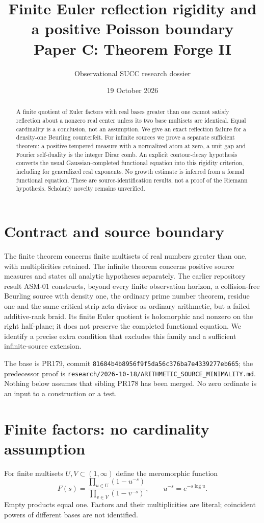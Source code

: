 \documentclass[11pt]{article}
\title{Finite Euler reflection rigidity and a positive Poisson boundary\\
\large Paper C: Theorem Forge II}
\author{Observational SUCC research dossier}
\date{19 October 2026}
\theoremstyle{remark}\newtheorem{remark}[theorem]{Remark}
\begin{document}
\maketitle
\begin{abstract}
A finite quotient of Euler factors with real bases greater than one cannot
satisfy reflection about a nonzero real center unless its two base multisets
are identical. Equal cardinality is a conclusion, not an assumption. We give
an exact reflection failure for a density-one Beurling counterfeit. For infinite
sources we prove a separate sufficient theorem: a positive tempered measure
with a normalized atom at zero, a unit gap and Fourier self-duality is the
integer Dirac comb. An explicit contour-decay hypothesis converts the usual
Gaussian-completed functional equation into this rigidity criterion, including
for generalized real exponents. No growth estimate is inferred from a formal
functional equation. These are source-identification results, not a proof of
the Riemann hypothesis. Scholarly novelty remains unverified.
\end{abstract}

\section{Contract and source boundary}
The finite theorem concerns finite multisets of real numbers greater than
one, with multiplicities retained. The infinite theorem concerns positive
source measures and states all analytic hypotheses separately. The earlier
repository result ASM-01 constructs, beyond every finite observation horizon,
a collision-free Beurling source with density one, the ordinary prime number
theorem, residue one and the same critical-strip zeta divisor as ordinary
arithmetic, but a failed additive-rank braid. Its finite Euler quotient is
holomorphic and nonzero on the right half-plane; it does not preserve
the completed functional equation. We identify a precise extra condition that
excludes this family and a sufficient infinite-source extension.

The base is PR179, commit
\texttt{81684b4b8956f9f5da56c376ba7e4339277eb665}; the predecessor proof is
\texttt{research/2026-10-18/ARITHMETIC\_SOURCE\_MINIMALITY.md}.
Nothing below assumes that sibling PR178 has been merged. No zero ordinate
is an input to a construction or a test.

\section{Finite factors: no cardinality assumption}
For finite multisets $U,V\subset(1,\infty)$ define the meromorphic function
\[
 F(s)=\frac{\prod_{u\in U}(1-u^{-s})}{\prod_{v\in V}(1-v^{-s})},
 \qquad u^{-s}=e^{-s\log u}.
\]
Empty products equal one. Factors and their multiplicities are literal;
coincident powers of different bases are not identified.
\end{document}
